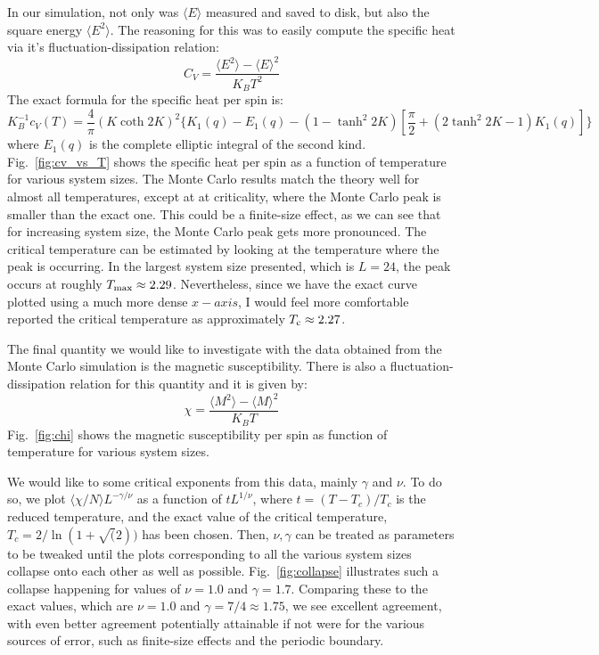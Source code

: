 \documentclass[12pt]{article}
\newcommand{\figref}[1]{Fig.~\ref{#1}}
\begin{document}
In our simulation, not only was $\langle E \rangle$ measured and saved to disk, but also the square energy $\langle E^2 \rangle$. The reasoning for this was to easily compute the specific heat via it's fluctuation-dissipation relation:
%
\begin{equation}
C_V = \frac{\langle E^2 \rangle - \langle E \rangle^2}{K_B T^2}
\end{equation}
%
The exact formula for the specific heat per spin is:
%
\begin{equation}
K_B^{-1} c_V(T) = \frac{4}{\pi} (K \coth 2K)^2 \lbrace K_1(q) - E_1(q) - (1-\tanh^2 2K) [\frac{\pi}{2}+(2 \tanh^2 2K - 1)K_1(q)] \rbrace 
\end{equation}
%
where $E_1(q)$ is the complete elliptic integral of the second kind. \figref{fig:cv_vs_T} shows the specific heat per spin as a function of temperature for various system sizes. The Monte Carlo results match the theory well for almost all temperatures, except at at criticality, where the Monte Carlo peak is smaller than the exact one. This could be a finite-size effect, as we can see that for increasing system size, the Monte Carlo peak gets more pronounced. The critical temperature can be estimated by looking at the temperature where the peak is occurring. In the largest system size presented, which is $L=24$, the peak occurs at roughly $T_{\rm{max}}\approx2.29$. Nevertheless, since we have the exact curve plotted using a much more dense $x-axis$, I would feel more comfortable reported the critical temperature as approximately $T_{\rm{c}} \approx 2.27$.

The final quantity we would like to investigate with the data obtained from the Monte Carlo simulation is the magnetic susceptibility. There is also a fluctuation-dissipation relation for this quantity and it is given by:
%
\begin{equation}
\chi = \frac{\langle M^2 \rangle - \langle M \rangle^2}{K_B T}
\end{equation}
%
\figref{fig:chi} shows the magnetic susceptibility per spin as function of temperature for various system sizes.

We would like to some critical exponents from this data, mainly $\gamma$ and $\nu$. To do so, we plot $\langle \chi / N \rangle L^{-\gamma/\nu}$ as a function of $t L^{1/\nu}$, where $t = (T-T_c)/T_c$ is the reduced temperature, and the exact value of the critical temperature, $T_c = 2/\ln (1+\sqrt(2))$ has been chosen. Then, $\nu,\gamma$ can be treated as parameters to be tweaked until the plots corresponding to all the various system sizes collapse onto each other as well as possible. \figref{fig:collapse} illustrates such a collapse happening for values of $\nu = 1.0$ and $\gamma = 1.7$. Comparing these to the exact values, which are $\nu = 1.0$ and $\gamma = 7/4 \approx 1.75$, we see excellent agreement, with even better agreement potentially attainable if not were for the various sources of error, such as finite-size effects and the periodic boundary.
\end{document}
